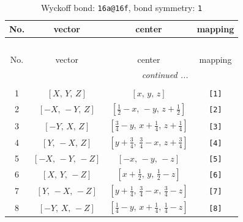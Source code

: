 \documentclass[fleqn,8pt]{jsarticle}
\begin{document}
\begin{longtable}{cccc}
\caption{Wyckoff bond: {\tt 16a@16f}, bond symmetry: {\tt 1}}
 \\
 \hline \hline
No. & vector & center & mapping \\ \hline \endfirsthead

\multicolumn{3}{l}{\tablename\ \thetable{}} \\
 \hline \hline
No. & vector & center & mapping \\ \hline \endhead

 \hline \hline
\multicolumn{3}{r}{\footnotesize\it continued ...} \\ \endfoot

 \hline \hline
\multicolumn{3}{r}{} \\ \endlastfoot

1 & $\left[ X,\, Y,\, Z \right]$ & $\left[ x,\, y,\, z \right]$ & {\tt [1]} \\ \hline
2 & $\left[ - X,\, - Y,\, Z \right]$ & $\left[ \frac{1}{2} - x,\, - y,\, z + \frac{1}{2} \right]$ & {\tt [2]} \\ \hline
3 & $\left[ - Y,\, X,\, Z \right]$ & $\left[ \frac{3}{4} - y,\, x + \frac{1}{4},\, z + \frac{1}{4} \right]$ & {\tt [3]} \\ \hline
4 & $\left[ Y,\, - X,\, Z \right]$ & $\left[ y + \frac{3}{4},\, \frac{3}{4} - x,\, z + \frac{3}{4} \right]$ & {\tt [4]} \\ \hline
5 & $\left[ - X,\, - Y,\, - Z \right]$ & $\left[ - x,\, - y,\, - z \right]$ & {\tt [5]} \\ \hline
6 & $\left[ X,\, Y,\, - Z \right]$ & $\left[ x + \frac{1}{2},\, y,\, \frac{1}{2} - z \right]$ & {\tt [6]} \\ \hline
7 & $\left[ Y,\, - X,\, - Z \right]$ & $\left[ y + \frac{1}{4},\, \frac{3}{4} - x,\, \frac{3}{4} - z \right]$ & {\tt [7]} \\ \hline
8 & $\left[ - Y,\, X,\, - Z \right]$ & $\left[ \frac{1}{4} - y,\, x + \frac{1}{4},\, \frac{1}{4} - z \right]$ & {\tt [8]} \\
\end{longtable}
\end{document}
